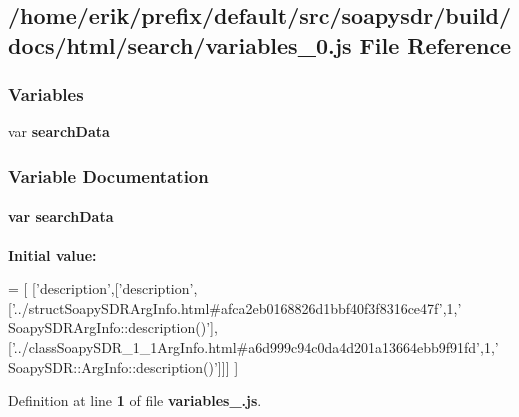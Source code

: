 \subsection{/home/erik/prefix/default/src/soapysdr/build/docs/html/search/variables\+\_\+0.js File Reference}
\label{variables__0_8js}
\subsubsection*{Variables}
\begin{DoxyCompactItemize}
\item 
var {\bf search\+Data}
\end{DoxyCompactItemize}


\subsubsection{Variable Documentation}
\paragraph[{search\+Data}]{\setlength{\rightskip}{0pt plus 5cm}var search\+Data}\label{variables__0_8js_ad01a7523f103d6242ef9b0451861231e}
{\bfseries Initial value\+:}
\begin{DoxyCode}
=
[
  [\textcolor{stringliteral}{'description'},[\textcolor{stringliteral}{'description'},[\textcolor{stringliteral}{'../structSoapySDRArgInfo.html#afca2eb0168826d1bbf40f3f8316ce47f'},1,\textcolor{stringliteral}{'
      SoapySDRArgInfo::description()'}],[\textcolor{stringliteral}{'../classSoapySDR\_1\_1ArgInfo.html#a6d999c94c0da4d201a13664ebb9f91fd'},1,\textcolor{stringliteral}{'
      SoapySDR::ArgInfo::description()'}]]]
]
\end{DoxyCode}


Definition at line {\bf 1} of file {\bf variables\+\_.\+js}.

